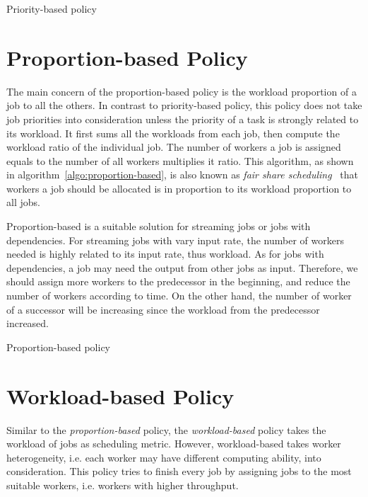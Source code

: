 \begin{algorithm}[htbp]
  
  \caption{Priority-based policy}
  \label{algo:priority-based}
\end{algorithm}

\section{Proportion-based Policy}

The main concern of the proportion-based policy is the workload
proportion of a job to all the others.
In contrast to priority-based policy, this policy does not take job
priorities into consideration unless the priority of a task is strongly
related to its workload.
It first sums all the workloads from each job, then compute the workload
ratio of the individual job.
The number of workers a job is assigned equals to the number of all 
workers multiplies it ratio.
This algorithm, as shown in algorithm~\ref{algo:proportion-based}, is
also known as \emph{fair share
scheduling}~\cite{cite:fair-share-scheduling} that workers a job should
be allocated is in proportion to its workload proportion to all jobs. 

Proportion-based is a suitable solution for streaming jobs or jobs with
dependencies.
For streaming jobs with vary input rate, the number of workers needed is
highly related to its input rate, thus workload.
As for jobs with dependencies, a job may need the output from other 
jobs as input.
Therefore, we should assign more workers to the predecessor in the
beginning, and reduce the number of workers according to time.
On the other hand, the number of worker of a successor will be 
increasing since the workload from the predecessor increased.

\begin{algorithm}[htbp]
  
  \caption{Proportion-based policy}
  \label{algo:proportion-based}
\end{algorithm}


\section{Workload-based Policy}


Similar to the \emph{proportion-based} policy, the \emph{workload-based}
policy takes the workload of jobs as scheduling metric.
However, workload-based takes worker heterogeneity, i.e. each
worker may have different computing ability, into consideration.
This policy tries to finish every job by assigning jobs to the most
suitable workers, i.e. workers with higher throughput.

